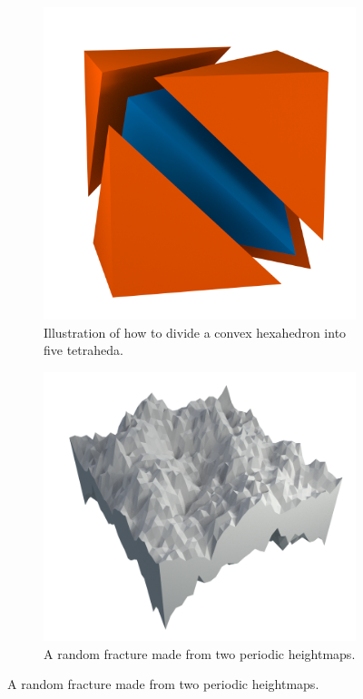 \begin{figure}
    \centering
    \begin{subfigure}[b]{0.35\textwidth}
        \includegraphics[width=\textwidth]{images/fracture/hexahedron_to_tetrahedra01_cycles_n200.png}
        \caption{Illustration of how to divide a convex hexahedron into five tetraheda.}
        \label{fig:hex_to_tetra}
    \end{subfigure}
    \hspace{5mm}
    \begin{subfigure}[b]{0.55\textwidth}
        \includegraphics[width=\textwidth]{images/fracture/fracture05_n200.png}
        \caption{A random fracture made from two periodic heightmaps.}
        \label{fig:fracture_model}
    \end{subfigure}
\end{figure}

